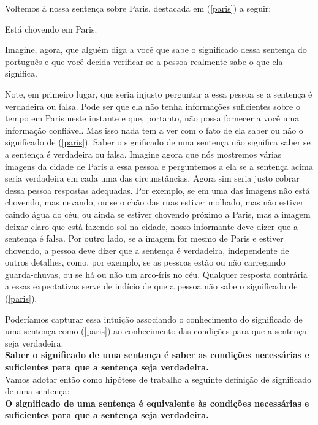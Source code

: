 Voltemos à nossa sentença sobre Paris, destacada em (\ref{paris}) a seguir:

\begin{exe}
	\ex Está chovendo em Paris.\label{paris}
\end{exe}


\n Imagine, agora, que alguém diga a você que sabe o significado dessa sentença do português e que você decida verificar se a pessoa realmente sabe o
que ela significa.


Note, em primeiro lugar, que seria injusto perguntar a
essa pessoa se a sentença é verdadeira ou falsa. Pode ser que ela
não tenha informa\-çõ\-es suficientes sobre o tempo em Paris neste
instante e que, portanto, não possa fornecer a você uma
informa\-ção confiável. Mas isso nada tem a ver com o fato de ela
saber ou não o significado de (\ref{paris}). Saber o significado
de uma sentença não significa saber se a sentença é verdadeira ou
falsa. Imagine agora que nós mostremos várias imagens da cidade de
Paris a essa pessoa e perguntemos a ela se a sentença acima seria
verdadeira em cada uma das circunstâncias. Agora sim seria justo
cobrar dessa pessoa respostas adequadas. Por exemplo, se em uma
das imagens não está chovendo, mas nevando, ou se o chão das ruas
estiver molhado, mas não estiver caindo água do céu, ou ainda se
estiver chovendo próximo a Paris, mas a imagem deixar claro que
está fazendo sol na cidade, nosso informante deve dizer que a
sentença é falsa. Por outro lado, se a imagem for mesmo de Paris e
estiver chovendo, a pessoa deve dizer que a sentença é verdadeira,
independente de outros detalhes, como, por exemplo, se as pessoas
estão ou não carregando guarda-chuvas, ou se há ou não um
arco-íris no céu. Qualquer resposta contrária a essas expectativas
serve de indício de que a pessoa não sabe o significado de
(\ref{paris}).

Poderíamos capturar essa intuição associando o conhecimento do
significado de uma sentença como (\ref{paris}) ao conhecimento das
condi\-çõ\-es para que a sentença seja
verdadeira.\\

\noindent \textbf{Saber o significado de uma sentença é saber as
condi\-çõ\-es necessárias e suficientes para que a sentença seja
verdadeira.}\\

Vamos adotar então como hipótese de trabalho a seguinte
defini\-ção de significado de uma sentença:\\

\noindent \textbf{O significado de uma sentença é equivalente às
condi\-çõ\-es necessárias e suficientes para que a sentença seja
verdadeira.}\\

